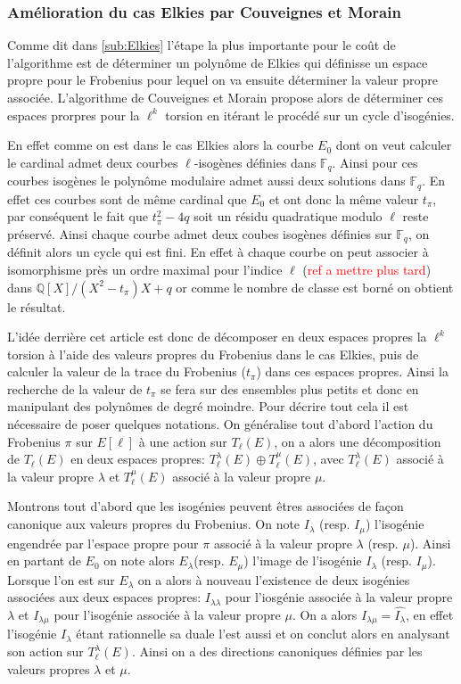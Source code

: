 \documentclass[10pt,a4paper]{book}
\theoremstyle{plain}
\theoremstyle{definition}
\theoremstyle{definition}
\theoremstyle{definition}
\theoremstyle{definition}
\theoremstyle{remark}
\theoremstyle{remark}
\begin{document}
\subsubsection{Amélioration du cas Elkies par Couveignes et Morain}
Comme dit dans \ref{sub:Elkies} l'étape la plus importante pour le coût de l'algorithme est de déterminer un polynôme de Elkies qui définisse un espace propre pour le Frobenius pour lequel on va ensuite déterminer la valeur propre associée. L'algorithme de Couveignes et Morain propose alors de déterminer ces espaces prorpres pour la $\ell^k$ torsion en itérant le procédé sur un cycle d'isogénies.

En effet comme on est dans le cas Elkies alors la courbe $E_0$ dont on veut calculer le cardinal admet deux  courbes $\ell$-isogènes définies dans $\mathbb{F}_q$. Ainsi pour ces courbes isogènes le polynôme modulaire admet aussi deux solutions  dans $\mathbb{F}_q$. En effet ces courbes sont de même cardinal que $E_0$ et ont donc la même valeur $t_{\pi}$, par conséquent le fait que $t_{\pi}^2-4q$ soit un résidu quadratique modulo $\ell$ reste préservé. Ainsi chaque courbe admet deux coubes isogènes définies sur $\mathbb{F}_q$, on définit alors un cycle qui est fini. En effet à chaque courbe on peut associer à isomorphisme près un ordre maximal pour l'indice $\ell$ (\textcolor{red}{ref a mettre plus tard}) dans $\mathbb{Q}[X]/(X^2-t_{\pi})X+q$ or comme le nombre de classe est borné on obtient le résultat. 

L'idée derrière cet article est donc de décomposer en deux espaces propres la $\ell^k$ torsion à l'aide des valeurs propres du Frobenius dans le cas Elkies, puis de calculer la valeur de la trace du Frobenius ($t_{\pi}$) dans ces espaces propres. Ainsi la recherche de la valeur de $t_{\pi}$ se fera sur des ensembles plus petits et donc en manipulant des polynômes de degré moindre. Pour décrire tout cela il est nécessaire de poser quelques notations. On généralise tout d'abord l'action du Frobenius $\pi$ sur $E[\ell]$ à une action sur $T_{\ell}(E)$, on a alors une décomposition de $T_{\ell}(E)$ en deux espaces propres: $T_{\ell}^{\lambda}(E) \oplus T_{\ell}^{\mu}(E)$, avec $T_{\ell}^{\lambda}(E)$ associé à la valeur propre $\lambda$ et $T_{\ell}^{\mu}(E)$ associé à la valeur propre $\mu$. 


Montrons tout d'abord que les isogénies peuvent êtres associées de façon canonique aux valeurs propres du Frobenius. On note $I_{\lambda}$ (resp. $I_{\mu}$) l'isogénie engendrée par l'espace propre pour $\pi$ associé à la valeur propre $\lambda$ (resp. $\mu$). Ainsi en partant de $E_0$ on note alors $E_{\lambda}$(resp. $E_{\mu}$) l'image de l'isogénie $I_{\lambda}$ (resp. $I_{\mu}$). Lorsque l'on est sur $E_{\lambda}$ on a alors à nouveau l'existence de deux isogénies associées aux deux espaces propres: $I_{\lambda \lambda}$ pour l'iosgénie associée à la valeur propre $\lambda$ et $I_{\lambda \mu}$ pour l'isogénie associée à la valeur propre $\mu$. On a alors $I_{\lambda \mu}=\widehat{I_{\lambda}}$, en effet l'isogénie $I_{\lambda}$ étant rationnelle sa duale l'est aussi et on conclut alors en analysant son action sur $T_{\ell}^{\lambda}(E)$. Ainsi on a des directions canoniques définies par les valeurs propres $\lambda$ et $\mu$. 
\end{document}
